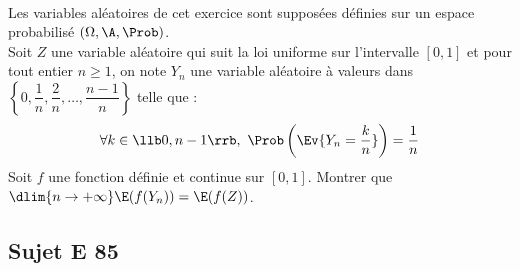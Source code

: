 \documentclass[11pt]{article}
\begin{document}

\begin{exerciceSP}~\\
Les variables aléatoires de cet exercice sont supposées définies sur un 
espace probabilisé $(\Omega,\A,\Prob)$.\\
Soit $Z$ une variable aléatoire qui suit la loi uniforme sur 
l'intervalle $[0,1]$ et pour tout entier $n\geq 1$, on note $Y_n$ une 
variable aléatoire à valeurs dans 
$\left\{0,\dfrac{1}{n},\dfrac{2}{n},\hdots, \dfrac{n-1}{n}\right\}$ 
telle que : 
\[
  \forall k\in\llb 0,n-1\rrb, \ 
  \Prob\left(\Ev{Y_n=\dfrac{k}{n}}\right)=\dfrac{1}{n}
\]
Soit $f$ une fonction définie et continue sur $[0,1]$. Montrer que 
$\dlim{n\to+\infty} \E(f(Y_n))=\E(f(Z))$.
\end{exerciceSP}


\newpage


\subsection*{Sujet E 85}

\end{document}
